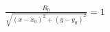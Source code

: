 \documentclass[preview]{standalone}
\begin{document}
\begin{align*}
\frac{R_0}{\sqrt{(x - x_0) ^ 2 + (y - y_0) ^ 2}} = 1
\end{align*}
\end{document}
